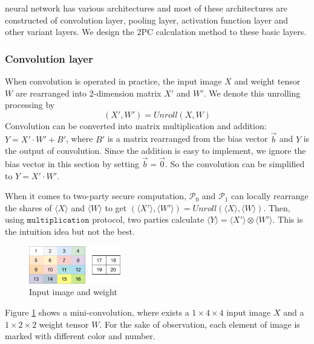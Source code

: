 \documentclass[letterpaper]{article} %
\begin{document}
    neural network has various architectures and
    most of these architectures are constructed of convolution layer,
    pooling layer, activation function layer and other variant layers.
    We design the 2PC calculation method to these basic layers.

    \subsubsection{Convolution layer}


    When convolution is operated in practice,
    the input image $X$ and weight tensor $W$
    are rearranged into 2-dimension matrix $X'$ and $W'$.
    We denote this unrolling processing by
    $$(X',W')=Unroll(X,W)$$
    Convolution can be converted into matrix multiplication and addition:
    $Y=X'\cdot W'+B'$, where $B'$ is a matrix rearranged from the bias vector $\overrightarrow{b}$ and
    $Y$ is the output of convolution.
    Since the addition is easy to implement, we ignore the bias vector in this section by setting $\overrightarrow{b}=\overrightarrow{0}$.
    So the convolution can be simplified to $Y=X'\cdot W'$.

    When it comes to two-party secure computation,
    $\mathcal{P}_{0}$ and $\mathcal{P}_{1}$ can locally
    rearrange the shares of $\langle X\rangle$ and $\langle W\rangle$ to get
    $(\langle X'\rangle,\langle W'\rangle)=Unroll(\langle X\rangle,\langle W\rangle)$.
    Then, using $\mathtt{multiplication}$ protocol,
    two parties calculate $\langle Y\rangle=\langle X'\rangle\otimes \langle W'\rangle$.
    This is the intuition idea but not the best.

    \begin{figure}[htbp]
        \centering
        \includegraphics[width=4cm]{new_unrolling.png}
        \caption{Input image and weight}
        \label{input image and weight}
    \end{figure}

    Figure \ref{input image and weight} shows a mini-convolution,
    where exists a $1\times 4\times 4$ input image $X$  and a $1\times 2\times 2$ weight tensor $W$.
    For the sake of observation, each element of image is marked with different color and number.
\end{document}
